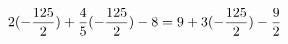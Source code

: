 \documentclass[preview]{standalone}
\begin{document}
\begin{align*}
\special{dvisvgm:raw <g id='unique000'>}2(- \frac{125}{2}) + \frac{4}{5} (- \frac{125}{2}) - 8 = 9 + 3(- \frac{125}{2}) - \frac{9}{2}\special{dvisvgm:raw </g>}
\end{align*}
\end{document}

